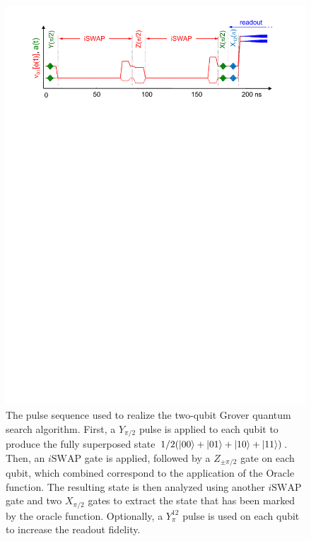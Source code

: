 \begin{figure}[h!]
	\centering
		\includegraphics[width=1.\textwidth]{./material/papers/grover/figures/grover_algorithm_pulse_sequence}
	\caption[Pulse sequence used for implementing Grovers search algorithm]{The pulse sequence used to realize the two-qubit Grover quantum search algorithm. First, a $Y_{\pi/2}$ pulse is applied to each qubit to produce the fully superposed state $1/2(\left| 00 \right>+\left| 01 \right>+\left| 10 \right>+\left| 11 \right>)$. Then, an $i\mathrm{SWAP}$ gate is applied, followed by a $Z_{\pm \pi /2}$ gate on each qubit, which combined correspond to the application of the Oracle function. The resulting state is then analyzed using another $i\mathrm{SWAP}$ gate and two $X_{\pi/2}$ gates to extract the state that has been marked by the oracle function. Optionally, a $Y^{12}_{\pi}$ pulse is used on each qubit to increase the readout fidelity.}
	\label{fig:GroverPulseSequence}
\end{figure}

